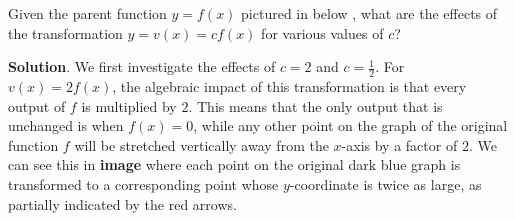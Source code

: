 \documentclass{ximera}
\begin{document}
\begin{example}
Given the parent function \(y = f(x)\) pictured in below , what are the effects of the transformation \(y = v(x) = cf(x)\) for various values of \(c\)?%

\noindent\textbf{Solution}.
We first investigate the effects of \(c = 2\) and \(c = \frac{1}{2}\).  For \(v(x) = 2f(x)\), the algebraic impact of this transformation is that every output of \(f\) is multiplied by \(2\).  This means that the only output that is unchanged is when \(f(x) = 0\), while any other point on the graph of the original function \(f\) will be stretched vertically away from the \(x\)-axis by a factor of \(2\).  We can see this in \textbf{image} where each point on the original dark blue graph is transformed to a corresponding point whose \(y\)-coordinate is twice as large, as partially indicated by the red arrows.%


\end{example}
\end{document}
